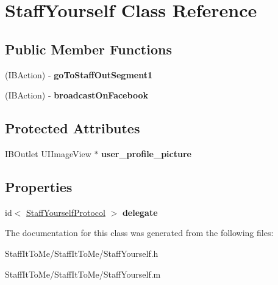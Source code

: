 \hypertarget{interface_staff_yourself}{
\section{\-Staff\-Yourself \-Class \-Reference}
\label{interface_staff_yourself}
}
\subsection*{\-Public \-Member \-Functions}
\begin{DoxyCompactItemize}
\item 
\hypertarget{interface_staff_yourself_a9b18b0a5634a43ac0f8b9ddbba710e2b}{
(\-I\-B\-Action) -\/ {\bfseries go\-To\-Staff\-Out\-Segment1}}
\label{interface_staff_yourself_a9b18b0a5634a43ac0f8b9ddbba710e2b}

\item 
\hypertarget{interface_staff_yourself_a22b6c43399e5b44ac67ca00f7c24e2f0}{
(\-I\-B\-Action) -\/ {\bfseries broadcast\-On\-Facebook}}
\label{interface_staff_yourself_a22b6c43399e5b44ac67ca00f7c24e2f0}

\end{DoxyCompactItemize}
\subsection*{\-Protected \-Attributes}
\begin{DoxyCompactItemize}
\item 
\hypertarget{interface_staff_yourself_ae4e44c32ee4f24cc22d0f3390cc9f762}{
\-I\-B\-Outlet \-U\-I\-Image\-View $\ast$ {\bfseries user\-\_\-profile\-\_\-picture}}
\label{interface_staff_yourself_ae4e44c32ee4f24cc22d0f3390cc9f762}

\end{DoxyCompactItemize}
\subsection*{\-Properties}
\begin{DoxyCompactItemize}
\item 
\hypertarget{interface_staff_yourself_a687f1bc705eab39a9b25e13d8c0fbeb3}{
id$<$ \hyperlink{protocol_staff_yourself_protocol-p}{\-Staff\-Yourself\-Protocol} $>$ {\bfseries delegate}}
\label{interface_staff_yourself_a687f1bc705eab39a9b25e13d8c0fbeb3}

\end{DoxyCompactItemize}


\-The documentation for this class was generated from the following files\-:\begin{DoxyCompactItemize}
\item 
\-Staff\-It\-To\-Me/\-Staff\-It\-To\-Me/\-Staff\-Yourself.\-h\item 
\-Staff\-It\-To\-Me/\-Staff\-It\-To\-Me/\-Staff\-Yourself.\-m\end{DoxyCompactItemize}
